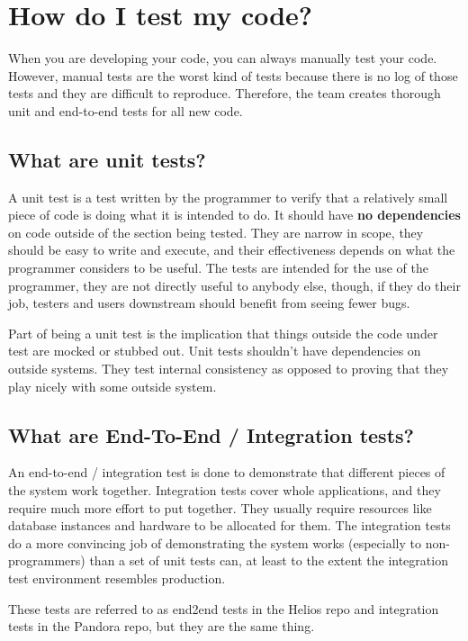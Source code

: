\documentclass[oneside]{book}
\begin{document}
\chapter{How do I test my code?}
When you are developing your code, you can always manually test your code. However, manual tests are the worst kind of tests because there is no log of those tests and they are difficult to reproduce. Therefore, the team creates thorough unit and end-to-end tests for all new code.
\section{What are unit tests?}
A unit test is a test written by the programmer to verify that a relatively small piece of code is doing what it is intended to do. It should have \textbf{no dependencies} on code outside of the section being tested. They are narrow in scope, they should be easy to write and execute, and their effectiveness depends on what the programmer considers to be useful. The tests are intended for the use of the programmer, they are not directly useful to anybody else, though, if they do their job, testers and users downstream should benefit from seeing fewer bugs.\par
Part of being a unit test is the implication that things outside the code under test are mocked or stubbed out. Unit tests shouldn't have dependencies on outside systems. They test internal consistency as opposed to proving that they play nicely with some outside system.
\section{What are End-To-End / Integration tests?}
An end-to-end / integration test is done to demonstrate that different pieces of the system work together. Integration tests cover whole applications, and they require much more effort to put together. They usually require resources like database instances and hardware to be allocated for them. The integration tests do a more convincing job of demonstrating the system works (especially to non-programmers) than a set of unit tests can, at least to the extent the integration test environment resembles production.\par
These tests are referred to as end2end tests in the Helios repo and integration tests in the Pandora repo, but they are the same thing.
\end{document}
